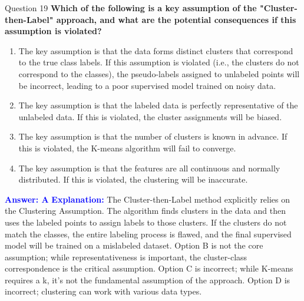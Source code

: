 \documentclass[8pt]{beamer}  %
\begin{document}
	\begin{frame}{Question 19}
		\textbf{Which of the following is a key assumption of the "Cluster-then-Label" approach, and what are the potential consequences if this assumption is violated?}
		\begin{enumerate}
			\item The key assumption is that the data forms distinct clusters that correspond to the true class labels. If this assumption is violated (i.e., the clusters do not correspond to the classes), the pseudo-labels assigned to unlabeled points will be incorrect, leading to a poor supervised model trained on noisy data.
			\item The key assumption is that the labeled data is perfectly representative of the unlabeled data. If this is violated, the cluster assignments will be biased.
			\item The key assumption is that the number of clusters is known in advance. If this is violated, the K-means algorithm will fail to converge.
			\item The key assumption is that the features are all continuous and normally distributed. If this is violated, the clustering will be inaccurate.
		\end{enumerate}
		\vspace{0.2cm}
		\textcolor{blue}{\textbf{Answer: A}}
		\vspace{0.2cm}
		\textcolor{blue}{\textbf{Explanation:}} The Cluster-then-Label method explicitly relies on the Clustering Assumption. The algorithm finds clusters in the data and then uses the labeled points to assign labels to those clusters. If the clusters do not match the classes, the entire labeling process is flawed, and the final supervised model will be trained on a mislabeled dataset. Option B is not the core assumption; while representativeness is important, the cluster-class correspondence is the critical assumption. Option C is incorrect; while K-means requires a k, it's not the fundamental assumption of the approach. Option D is incorrect; clustering can work with various data types.
	\end{frame}
	
\end{document}
